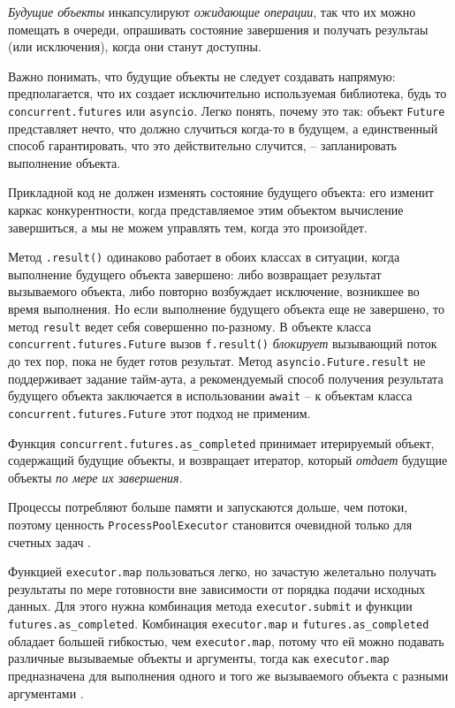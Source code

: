 \documentclass[%
	11pt,
	a4paper,
	utf8,
		]{article}
\begin{document}
\emph{Будущие объекты} инкапсулируют \emph{ожидающие операции}, так что их можно помещать в очереди, опрашивать состояние завершения и получать результаы (или исключения), когда они станут доступны.

Важно понимать, что будущие объекты не следует создавать напрямую: предполагается, что их создает исключительно используемая библиотека, будь то \verb*|concurrent.futures| или \verb|asyncio|. Легко понять, почему это так: объект \verb*|Future| представляет нечто, что должно случиться когда-то в будущем, а единственный способ гарантировать, что это действительно случится, -- запланировать выполнение объекта. 

Прикладной код не должен изменять состояние будущего объекта: его изменит каркас конкурентности, когда представляемое этим объектом вычисление завершиться, а мы не можем управлять тем, когда это произойдет.

Метод \verb|.result()| одинаково работает в обоих классах в ситуации, когда выполнение будущего объекта завершено: либо возвращает результат вызываемого объекта, либо повторно возбуждает исключение, возникшее во время выполнения. Но если выполнение будущего объекта еще не завершено, то метод \verb*|result| ведет себя совершенно по-разному. В объекте класса \verb|concurrent.futures.Future| вызов \verb*|f.result()| \emph{блокирует} вызывающий поток до тех пор, пока не будет готов результат. Метод \verb|asyncio.Future.result| не поддерживает задание тайм-аута, а рекомендуемый способ получения результата будущего объекта заключается в использовании \verb*|await| -- к объектам класса \verb|concurrent.futures.Future| этот подход не применим.

Функция \verb*|concurrent.futures.as_completed| принимает итерируемый объект, содержащий будущие объекты, и возвращает итератор, который \emph{отдает} будущие объекты \emph{по мере их завершения}.

Процессы потребляют больше памяти и запускаются дольше, чем потоки, поэтому ценность \verb|ProcessPoolExecutor| становится очевидной только для счетных задач \cite[]{ramalho:python-2022}.

Функцией \verb*|executor.map| пользоваться легко, но зачастую желетально получать результаты по мере готовности вне зависимости от порядка подачи исходных данных. Для этого нужна комбинация метода \verb|executor.submit| и функции \verb*|futures.as_completed|. Комбинация \verb|executor.map| и \verb*|futures.as_completed| обладает большей гибкостью, чем \verb|executor.map|, потому что ей можно подавать различные вызываемые объекты и аргументы, тогда как \verb*|executor.map| предназначена для выполнения одного и того же вызываемого объекта с разными аргументами \cite[]{ramalho:python-2022}.
\end{document}
